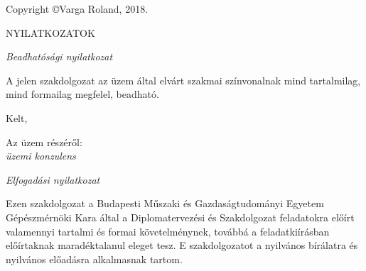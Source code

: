 \iffalse

\newpage\null\thispagestyle{empty}
\newpage\thispagestyle{empty}
Szerzői jog \textcopyright ~Knyihár Gábor, 2018.\\[2cm]

\begin{center}
    \bf ZÁRADÉK
\end{center}


{\bf Ez a szakdolgozat elzártan kezelendő és őrzendő, a hozzáférése a vonatkozó szabályok szerint korlátozott, a dolgozat tartalmát csak az arra feljogosí-tott személyek ismerhetik.}

{\bf A korlátozott hozzáférés időtartamának lejártáig az arra feljogosítottakon kívül csak a korlátozást kérelmező személy vagy gazdálkodó szervezet írásos engedélyéjével rendelkező személy nyerhet betekintést a dolgozat tartalmába.}\\[0.5cm]

{\bf A hozzáférés korlátozása és a zárt kezelés 2023. év december hónap 
31. napján ér véget.}

\fi

\newpage\null\thispagestyle{empty}
Copyright \copyright Varga Roland, 2018.


\newpage\null\thispagestyle{empty}
\newpage\thispagestyle{plain}
\begin{center}
    \Large \MakeUppercase{Nyilatkozatok}
\end{center}

{\centering \itshape Beadhatósági nyilatkozat \par}
A jelen szakdolgozat az üzem által elvárt szakmai színvonalnak mind tartalmilag, mind formailag megfelel, beadható.

Kelt, 

{\hspace{0.4\textwidth} Az üzem részéről:}\\[1cm]

{\hspace{0.6\textwidth} \itshape üzemi konzulens}\\[0.1cm]

{\centering \itshape Elfogadási nyilatkozat \par}
Ezen szakdolgozat a Budapesti Műszaki és Gazdaságtudományi Egyetem Gépészmérnöki Kara által a Diplomatervezési és Szakdolgozat feladatokra előírt valamennyi tartalmi és formai követelménynek, továbbá a feladatkiírásban előírtaknak maradéktalanul eleget tesz. E szakdolgozatot a nyilvános bírálatra és nyilvános előadásra alkalmasnak tartom. 

